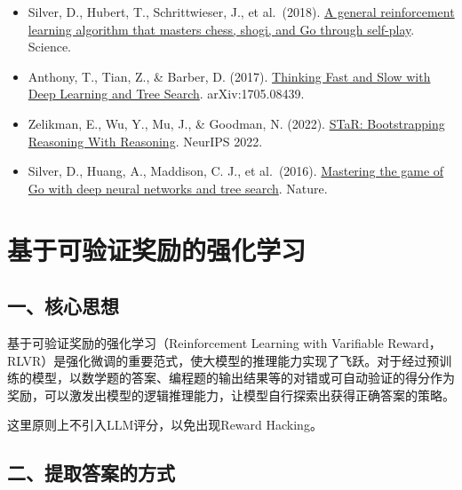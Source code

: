 \vspace{0.25em}
\begin{itemize}
\tightlist
\item
  Silver, D., Hubert, T., Schrittwieser, J., et al.~(2018). \href{https://www.science.org/doi/10.1126/science.aar6404}{A general reinforcement learning algorithm that masters chess, shogi, and Go through self-play}. Science.
\item
  Anthony, T., Tian, Z., \& Barber, D. (2017). \href{https://arxiv.org/abs/1705.08439}{Thinking Fast and Slow with Deep Learning and Tree Search}. arXiv:1705.08439.
\item
  Zelikman, E., Wu, Y., Mu, J., \& Goodman, N. (2022). \href{https://arxiv.org/abs/2203.14465}{STaR: Bootstrapping Reasoning With Reasoning}. NeurIPS 2022.
\item
  Silver, D., Huang, A., Maddison, C. J., et al.~(2016). \href{https://www.nature.com/articles/nature16961}{Mastering the game of Go with deep neural networks and tree search}. Nature.
\end{itemize}

\clearpage

\hypertarget{ux57faux4e8eux53efux9a8cux8bc1ux5956ux52b1ux7684ux5f3aux5316ux5b66ux4e60}{%
\section{基于可验证奖励的强化学习}\label{ux57faux4e8eux53efux9a8cux8bc1ux5956ux52b1ux7684ux5f3aux5316ux5b66ux4e60}}

\hypertarget{ux4e00ux6838ux5fc3ux601dux60f3-6}{%
\subsection{一、核心思想}\label{ux4e00ux6838ux5fc3ux601dux60f3-6}}

基于可验证奖励的强化学习（Reinforcement Learning with Varifiable Reward，RLVR）是强化微调的重要范式，使大模型的推理能力实现了飞跃。对于经过预训练的模型，以数学题的答案、编程题的输出结果等的对错或可自动验证的得分作为奖励，可以激发出模型的逻辑推理能力，让模型自行探索出获得正确答案的策略。

这里原则上不引入LLM评分，以免出现Reward Hacking。

\hypertarget{ux4e8cux63d0ux53d6ux7b54ux6848ux7684ux65b9ux5f0f}{%
\subsection{二、提取答案的方式}\label{ux4e8cux63d0ux53d6ux7b54ux6848ux7684ux65b9ux5f0f}}

